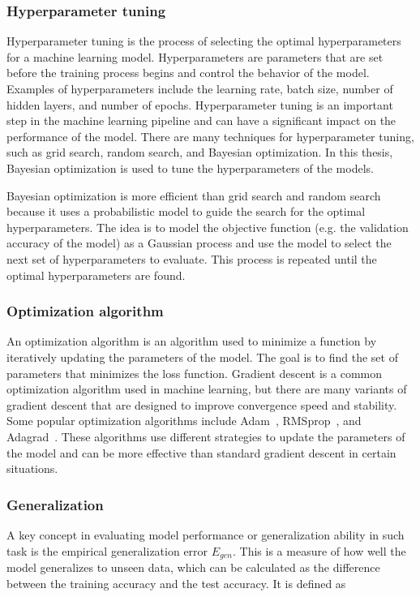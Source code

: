 \documentclass{article}
\begin{document}
\subsubsection{Hyperparameter tuning}
Hyperparameter tuning is the process of selecting the optimal hyperparameters for a machine learning model. Hyperparameters are parameters that are set before the training process begins and control the behavior of the model. Examples of hyperparameters include the learning rate, batch size, number of hidden layers, and number of epochs. Hyperparameter tuning is an important step in the machine learning pipeline and can have a significant impact on the performance of the model. There are many techniques for hyperparameter tuning, such as grid search, random search, and Bayesian optimization. In this thesis, Bayesian optimization is used to tune the hyperparameters of the models.

Bayesian optimization is more efficient than grid search and random search because it uses a probabilistic model to guide the search for the optimal hyperparameters. The idea is to model the objective function (e.g. the validation accuracy of the model) as a Gaussian process and use the model to select the next set of hyperparameters to evaluate. This process is repeated until the optimal hyperparameters are found.

\subsubsection{Optimization algorithm}
An optimization algorithm is an algorithm used to minimize a function by iteratively updating the parameters of the model. The goal is to find the set of parameters that minimizes the loss function. Gradient descent is a common optimization algorithm used in machine learning, but there are many variants of gradient descent that are designed to improve convergence speed and stability. Some popular optimization algorithms include Adam~\cite{kingma2014adam}, RMSprop~\cite{graves2013generating}, and Adagrad~\cite{duchi2011adaptive}. These algorithms use different strategies to update the parameters of the model and can be more effective than standard gradient descent in certain situations. 

\subsubsection{Generalization}
A key concept in evaluating model performance or generalization ability in such task is the empirical generalization error $E_{gen}$. This is a measure of how well the model generalizes to unseen data, which can be calculated as the difference between the training accuracy and the test accuracy. It is defined as
\end{document}
